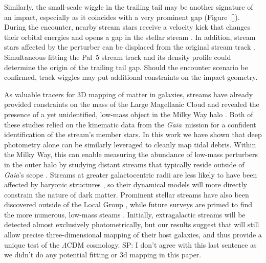 \documentclass[twocolumn]{aastex62}
\newcommand{\gaia}{\textsl{Gaia}}
\newcommand{\sa}[1]{{\color{magenta} SP: #1}}
\begin{document}
Similarly, the small-scale wiggle in the trailing tail may be another signature of an impact, especially as it coincides with a very prominent gap (Figure~\ref{}).
During the encounter, nearby stream stars receive a velocity kick that changes their orbital energies and opens a gap in the stellar stream \citep[e.g.,][]{Erkal:2015b}.
In addition, stream stars affected by the perturber can be displaced from the original stream track \citep{Bonaca:2018b}.
Simultaneous fitting the Pal~5 stream track and its density profile could determine the origin of the trailing tail gap.
Should the encounter scenario be confirmed, track wiggles may put additional constraints on the impact geometry.



As valuable tracers for 3D mapping of matter in galaxies, streams have already provided constraints on the mass of the Large Magellanic Cloud \citep{Erkal:2019} and revealed the presence of a yet unidentified, low-mass object in the Milky Way halo \citep{Bonaca:2018b}.
Both of these studies relied on the kinematic data from the \gaia\ mission for a confident identification of the stream's member stars.
In this work we have shown that deep photometry alone can be similarly leveraged to cleanly map tidal debris.
Within the Milky Way, this can enable measuring the abundance of low-mass perturbers in the outer halo by studying distant streams that typically reside outside of \gaia's scope \citep[cf.][]{Ibata:2019}.
 Streams at greater galactocentric radii are less likely to have been affected by baryonic structures \citep[e.g.,][]{Banik:2019}, so their dynamical models will more directly constrain the nature of dark matter.
Prominent stellar streams have also been discovered outside of the Local Group \citep[e.g.,][]{Martinez-Delgado:2010, Kado-Fong:2018}, while future surveys are primed to find the more numerous, low-mass steams \citep{Pearson:2019}. 
Initially, extragalactic streams will be detected almost exclusively photometrically, but our results suggest that will still allow precise three-dimensional mapping of their host galaxies, and thus provide a unique test of the $\Lambda$CDM cosmology. \sa{I don't agree with this last sentence as we didn't do any potential fitting or 3d mapping in this paper. }
\end{document}
